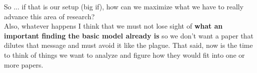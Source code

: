 \documentclass[11pt,letterpaper]{article}
\begin{document}
So ... if that is our setup (big if), how can we maximize what we have to really advance this area of research?\\


Also, whatever happens I think that we must not lose sight of {\bf what an important finding the basic model already is} so we don't want a paper that dilutes that message and must avoid it like the plague. That said, now is the time to think of things we want to analyze and figure how they would fit into one or more papers. 





\newpage





\end{document}
